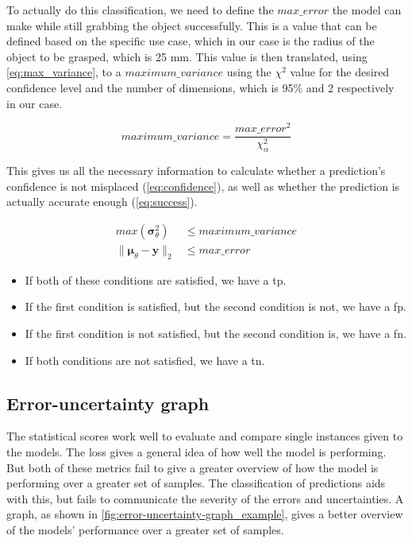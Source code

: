 To actually do this classification, we need to define the $max\_error$ the model can make while still grabbing the object successfully.
This is a value that can be defined based on the specific use case, which in our case is the radius of the object to be grasped, which is 25 mm.
This value is then translated, using \cref{eq:max_variance}, to a $maximum\_variance$ using the $\chi^2$ value for the desired confidence level and the number of dimensions, which is 95\% and 2 respectively in our case.

\begin{equation}\label{eq:max_variance}
    maximum\_variance = \frac{max\_error^2}{\chi^2_\alpha}
\end{equation}

This gives us all the necessary information to calculate whether a prediction's confidence is not misplaced (\cref{eq:confidence}), as well as whether the prediction is actually accurate enough (\cref{eq:success}).

\begin{subequations}
    \begin{align}
        max(\bm{\sigma}_\theta^2) &\leq maximum\_variance \label{eq:confidence} \\
        \|\bm{\mu}_\theta - \bm{y}\|_2 &\leq max\_error \label{eq:success}
    \end{align}
\end{subequations}

\begin{itemize}
    \item If both of these conditions are satisfied, we have a \gls{tp}.
    \item If the first condition is satisfied, but the second condition is not, we have a \gls{fp}.
    \item If the first condition is not satisfied, but the second condition is, we have a \gls{fn}.
    \item If both conditions are not satisfied, we have a \gls{tn}.
\end{itemize}


\subsection{Error-uncertainty graph}
The statistical scores work well to evaluate and compare single instances given to the models.
The loss gives a general idea of how well the model is performing.
But both of these metrics fail to give a greater overview of how the model is performing over a greater set of samples.
The classification of predictions aids with this, but fails to communicate the severity of the errors and uncertainties.
A graph, as shown in \cref{fig:error-uncertainty-graph_example}, gives a better overview of the models' performance over a greater set of samples.

